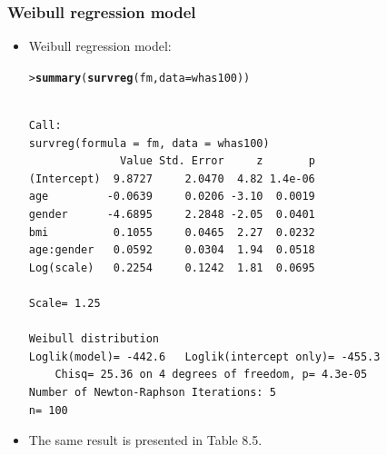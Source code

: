 \documentclass[10pt]{beamer}\usepackage[]{graphicx}\usepackage[]{color}
\makeatletter
\newcommand{\hlstd}[1]{\textcolor[rgb]{0.345,0.345,0.345}{#1}}%
\newcommand{\hlkwc}[1]{\textcolor[rgb]{0.333,0.667,0.333}{#1}}%
\newcommand{\hlkwd}[1]{\textcolor[rgb]{0.737,0.353,0.396}{\textbf{#1}}}%
\newenvironment{kframe}{%
 \def\at@end@of@kframe{}%
 \ifinner\ifhmode%
  \def\at@end@of@kframe{\end{minipage}}%
  \begin{minipage}{\columnwidth}%
 \fi\fi%
 \def\FrameCommand##1{\hskip\@totalleftmargin \hskip-\fboxsep
 \colorbox{shadecolor}{##1}\hskip-\fboxsep
     \hskip-\linewidth \hskip-\@totalleftmargin \hskip\columnwidth}%
 \MakeFramed {\advance\hsize-\width
   \@totalleftmargin\z@ \linewidth\hsize
   \@setminipage}}%
 {\par\unskip\endMakeFramed%
 \at@end@of@kframe}
\newenvironment{knitrout}{}{} %
\renewenvironment{knitrout}{\setlength{\topsep}{-.2mm}}{}
\makeatother
\begin{document}
\begin{frame}[fragile]
  \frametitle{Weibull regression model}
  \begin{itemize}
  \item Weibull regression model:
\begin{knitrout}\scriptsize
{}\color{fgcolor}\begin{kframe}
\begin{alltt}
\hlstd{> }\hlkwd{summary}\hlstd{(}\hlkwd{survreg}\hlstd{(fm,} \hlkwc{data} \hlstd{= whas100))}
\end{alltt}
\begin{verbatim}

Call:
survreg(formula = fm, data = whas100)
              Value Std. Error     z       p
(Intercept)  9.8727     2.0470  4.82 1.4e-06
age         -0.0639     0.0206 -3.10  0.0019
gender      -4.6895     2.2848 -2.05  0.0401
bmi          0.1055     0.0465  2.27  0.0232
age:gender   0.0592     0.0304  1.94  0.0518
Log(scale)   0.2254     0.1242  1.81  0.0695

Scale= 1.25 

Weibull distribution
Loglik(model)= -442.6   Loglik(intercept only)= -455.3
	Chisq= 25.36 on 4 degrees of freedom, p= 4.3e-05 
Number of Newton-Raphson Iterations: 5 
n= 100 
\end{verbatim}
\end{kframe}
\end{knitrout}
\item The same result is presented in Table 8.5.
\end{itemize}
\end{frame}
\end{document}
